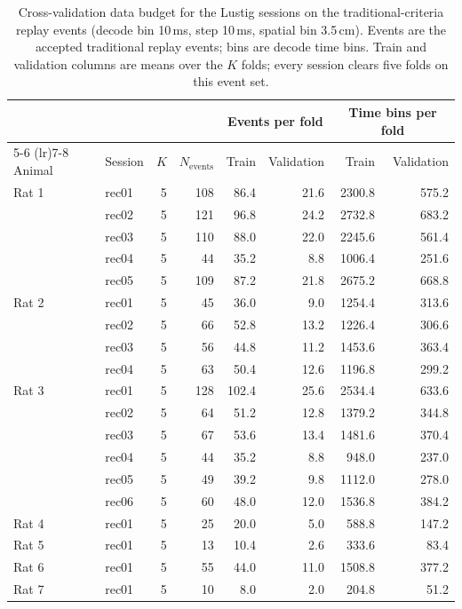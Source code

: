 \begin{table}[htbp]
  \centering
  \begin{tabular}{llrrrrrr}
    \toprule
    & & & & \multicolumn{2}{c}{Events per fold} & \multicolumn{2}{c}{Time bins per fold} \\
    \cmidrule(lr){5-6} \cmidrule(lr){7-8}
    Animal & Session & $K$ & $N_{\mathrm{events}}$ & Train & Validation & Train & Validation \\
    \midrule
    Rat 1 & rec01 & 5 & 108 & 86.4 & 21.6 & 2300.8 & 575.2 \\
     & rec02 & 5 & 121 & 96.8 & 24.2 & 2732.8 & 683.2 \\
     & rec03 & 5 & 110 & 88.0 & 22.0 & 2245.6 & 561.4 \\
     & rec04 & 5 & 44 & 35.2 & 8.8 & 1006.4 & 251.6 \\
     & rec05 & 5 & 109 & 87.2 & 21.8 & 2675.2 & 668.8 \\
    \addlinespace
    Rat 2 & rec01 & 5 & 45 & 36.0 & 9.0 & 1254.4 & 313.6 \\
     & rec02 & 5 & 66 & 52.8 & 13.2 & 1226.4 & 306.6 \\
     & rec03 & 5 & 56 & 44.8 & 11.2 & 1453.6 & 363.4 \\
     & rec04 & 5 & 63 & 50.4 & 12.6 & 1196.8 & 299.2 \\
    \addlinespace
    Rat 3 & rec01 & 5 & 128 & 102.4 & 25.6 & 2534.4 & 633.6 \\
     & rec02 & 5 & 64 & 51.2 & 12.8 & 1379.2 & 344.8 \\
     & rec03 & 5 & 67 & 53.6 & 13.4 & 1481.6 & 370.4 \\
     & rec04 & 5 & 44 & 35.2 & 8.8 & 948.0 & 237.0 \\
     & rec05 & 5 & 49 & 39.2 & 9.8 & 1112.0 & 278.0 \\
     & rec06 & 5 & 60 & 48.0 & 12.0 & 1536.8 & 384.2 \\
    \addlinespace
    Rat 4 & rec01 & 5 & 25 & 20.0 & 5.0 & 588.8 & 147.2 \\
    \addlinespace
    Rat 5 & rec01 & 5 & 13 & 10.4 & 2.6 & 333.6 & 83.4 \\
    \addlinespace
    Rat 6 & rec01 & 5 & 55 & 44.0 & 11.0 & 1508.8 & 377.2 \\
    \addlinespace
    Rat 7 & rec01 & 5 & 10 & 8.0 & 2.0 & 204.8 & 51.2 \\
    \bottomrule
  \end{tabular}
  \caption{Cross-validation data budget for the Lustig sessions on the traditional-criteria replay events (decode bin 10\,ms, step 10\,ms, spatial bin 3.5\,cm). Events are the accepted traditional replay events; bins are decode time bins. Train and validation columns are means over the $K$ folds; every session clears five folds on this event set.}
  \label{tab:cv-budget-lustig-tradreplay}
\end{table}
